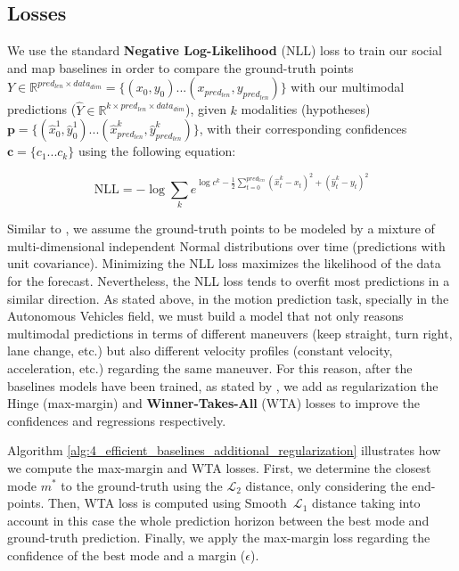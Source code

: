 \subsection{Losses}
\label{subsec:4_efficient_baselines_losses}

We use the standard \textbf{Negative Log-Likelihood} (NLL) loss to train our social and map baselines in order to compare the ground-truth points $Y \in \mathbb{R}^{pred_{len} \times data_{dim}} = \{(x_0,y_0) ... (x_{pred_{len}}, y_{pred_{len}})\}$ with our multimodal predictions ($\hat{Y} \in \mathbb{R}^{k \times pred_{len} \times data_{dim}}$), given $k$ modalities (hypotheses) $\mathbf{p}=\{(\hat{x}^1_0,\hat{y}^1_0) ... (\hat{x}^k_{pred_{len}}, \hat{y}^k_{pred_{len}})\}$, with their corresponding confidences $\mathbf{c}=\{c_1 ... c_k\}$ using the following equation:

\begin{equation}
	\text{NLL} = -\log \sum_{k} e^{ \log{c^k} - \frac{1}{2} \sum_{t=0}^{pred_{len}} (\hat{x}^k_t - x_t)^2 + (\hat{y}^k_t - y_t )^2 }
	\label{eq:nll}
\end{equation}

Similar to \cite{mercat2020multi}, we assume the ground-truth points to be modeled by a mixture of multi-dimensional independent Normal distributions over time (predictions with unit covariance). Minimizing the NLL loss maximizes the likelihood of the data for the forecast. Nevertheless, the NLL loss tends to overfit most predictions in a similar direction. As stated above, in the motion prediction task, specially in the Autonomous Vehicles field, we must build a model that not only reasons multimodal predictions in terms of different maneuvers (keep straight, turn right, lane change, etc.) but also different velocity profiles (constant velocity, acceleration, etc.) regarding the same maneuver. For this reason, after the baselines models have been trained, as stated by \cite{kim2022improving}, we add as regularization the Hinge (\aka max-margin) and \textbf{Winner-Takes-All} (WTA) \cite{liang2020learning, kim2022improving} losses to improve the confidences and regressions respectively. 

Algorithm \ref{alg:4_efficient_baselines_additional_regularization} illustrates how we compute the max-margin and WTA losses. First, we determine the closest mode $m^{*}$ to the ground-truth using the $\mathcal{L}_2$ distance, only considering the end-points. Then, WTA loss is computed using Smooth~$\mathcal{L}_1$ distance taking into account in this case the whole prediction horizon between the best mode and ground-truth prediction. Finally, we apply the max-margin loss regarding the confidence of the best mode and a margin ($\epsilon$).
	
